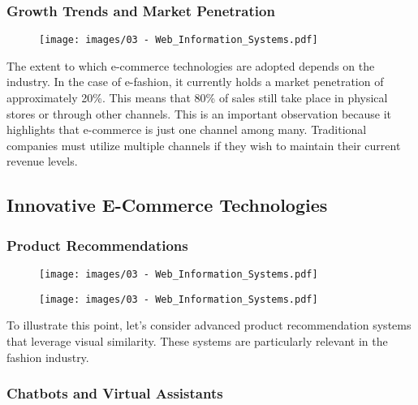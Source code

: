 \subsubsection{Growth Trends and Market
  Penetration}\label{growth-trends-and-market-penetration}

\begin{figure}[!h]
  \centering
  \texttt{[image: images/03 - Web\_Information\_Systems.pdf]}
\end{figure}

The extent to which e-commerce technologies are adopted depends on the
industry. In the case of e-fashion, it currently holds a market
penetration of approximately 20\%. This means that 80\% of sales still
take place in physical stores or through other channels. This is an
important observation because it highlights that e-commerce is just one
channel among many. Traditional companies must utilize multiple channels
if they wish to maintain their current revenue levels.

\subsection{Innovative E-Commerce
  Technologies}\label{innovative-e-commerce-technologies}

\subsubsection{Product Recommendations}\label{product-recommendations}

\begin{figure}[!h]
  \centering
  \texttt{[image: images/03 - Web\_Information\_Systems.pdf]}
\end{figure}

\begin{figure}[!h]
  \centering
  \texttt{[image: images/03 - Web\_Information\_Systems.pdf]}
\end{figure}

To illustrate this point, let's consider advanced product recommendation
systems that leverage visual similarity. These systems are particularly
relevant in the fashion industry.

\subsubsection{Chatbots and Virtual
  Assistants}\label{chatbots-and-virtual-assistants}

